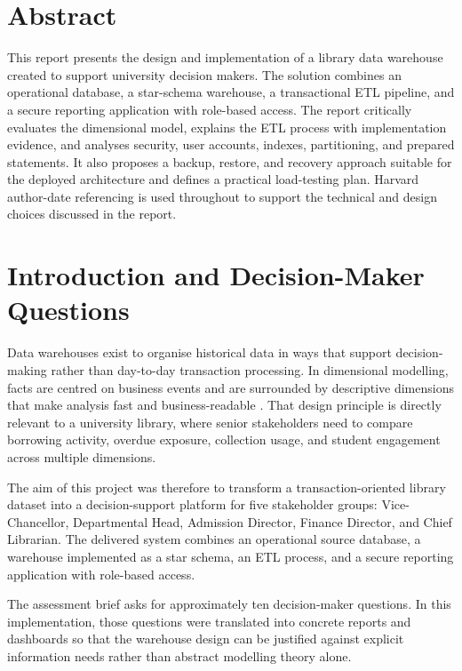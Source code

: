 \documentclass[12pt,a4paper]{article}
\begin{document}
\section*{Abstract}
This report presents the design and implementation of a library data warehouse created to support university decision makers. The solution combines an operational database, a star-schema warehouse, a transactional ETL pipeline, and a secure reporting application with role-based access. The report critically evaluates the dimensional model, explains the ETL process with implementation evidence, and analyses security, user accounts, indexes, partitioning, and prepared statements. It also proposes a backup, restore, and recovery approach suitable for the deployed architecture and defines a practical load-testing plan. Harvard author-date referencing is used throughout to support the technical and design choices discussed in the report.

\tableofcontents
\newpage


\section{Introduction and Decision-Maker Questions}
Data warehouses exist to organise historical data in ways that support decision-making rather than day-to-day transaction processing. In dimensional modelling, facts are centred on business events and are surrounded by descriptive dimensions that make analysis fast and business-readable \citep{kimball2013}. That design principle is directly relevant to a university library, where senior stakeholders need to compare borrowing activity, overdue exposure, collection usage, and student engagement across multiple dimensions.

The aim of this project was therefore to transform a transaction-oriented library dataset into a decision-support platform for five stakeholder groups: Vice-Chancellor, Departmental Head, Admission Director, Finance Director, and Chief Librarian. The delivered system combines an operational source database, a warehouse implemented as a star schema, an ETL process, and a secure reporting application with role-based access.

The assessment brief asks for approximately ten decision-maker questions. In this implementation, those questions were translated into concrete reports and dashboards so that the warehouse design can be justified against explicit information needs rather than abstract modelling theory alone.
\end{document}
